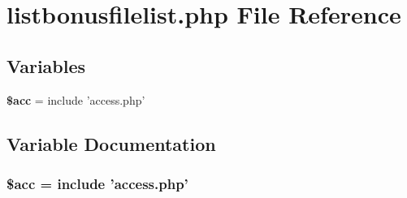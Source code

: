 \section{listbonusfilelist.php File Reference}
\label{listbonusfilelist_8php}


\subsection*{Variables}
\begin{CompactItemize}
\item 
{\bf \$acc} = include 'access.php'
\end{CompactItemize}


\subsection{Variable Documentation}
\subsubsection{\setlength{\rightskip}{0pt plus 5cm}\$acc = include 'access.php'}\label{listbonusfilelist_8php_542926c588a05eb69553d79c83cf73da}


